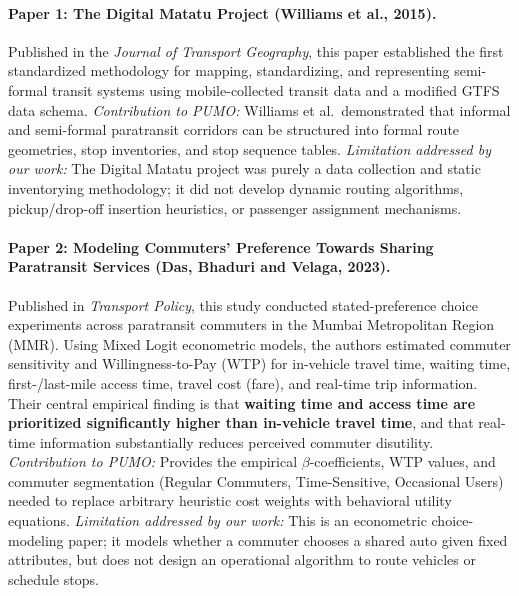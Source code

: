 \paragraph{Paper 1: The Digital Matatu Project (Williams et al., 2015).}
Published in the \emph{Journal of Transport Geography}, this paper established the first standardized methodology for mapping, standardizing, and representing semi-formal transit systems using mobile-collected transit data and a modified GTFS data schema. 
\emph{Contribution to PUMO:} Williams et al.\ demonstrated that informal and semi-formal paratransit corridors can be structured into formal route geometries, stop inventories, and stop sequence tables. 
\emph{Limitation addressed by our work:} The Digital Matatu project was purely a data collection and static inventorying methodology; it did not develop dynamic routing algorithms, pickup/drop-off insertion heuristics, or passenger assignment mechanisms.

\paragraph{Paper 2: Modeling Commuters' Preference Towards Sharing Paratransit Services (Das, Bhaduri and Velaga, 2023).}
Published in \emph{Transport Policy}, this study conducted stated-preference choice experiments across paratransit commuters in the Mumbai Metropolitan Region (MMR). Using Mixed Logit econometric models, the authors estimated commuter sensitivity and Willingness-to-Pay (WTP) for in-vehicle travel time, waiting time, first-/last-mile access time, travel cost (fare), and real-time trip information. Their central empirical finding is that \textbf{waiting time and access time are prioritized significantly higher than in-vehicle travel time}, and that real-time information substantially reduces perceived commuter disutility.
\emph{Contribution to PUMO:} Provides the empirical $\beta$-coefficients, WTP values, and commuter segmentation (Regular Commuters, Time-Sensitive, Occasional Users) needed to replace arbitrary heuristic cost weights with behavioral utility equations.
\emph{Limitation addressed by our work:} This is an econometric choice-modeling paper; it models whether a commuter chooses a shared auto given fixed attributes, but does not design an operational algorithm to route vehicles or schedule stops.


